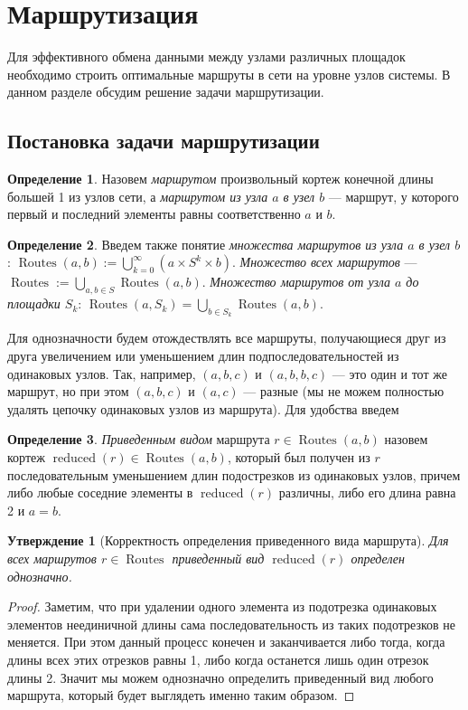\documentclass{article}
\theoremstyle{plain}
\theoremstyle{plain}
\theoremstyle{plain}
\theoremstyle{plain}
\newtheorem{claim}{Утверждение}[section]
\theoremstyle{definition}
\newtheorem{definition}{Определение}[section]
\theoremstyle{remark}
\theoremstyle{plain}
\DeclareMathOperator*{\routes}{Routes}
\DeclareMathOperator*{\reduced}{reduced}
\begin{document}
\section{Маршрутизация}
\label{RoutingSection}

Для эффективного обмена данными между узлами различных площадок необходимо строить оптимальные маршруты в сети на уровне узлов системы. В данном разделе обсудим решение задачи маршрутизации.

\subsection{Постановка задачи маршрутизации}

\begin{definition}
    Назовем \textit{маршрутом} произвольный кортеж конечной длины большей 1 из узлов сети, а \textit{маршрутом из узла $a$ в узел $b$} --- маршрут, у которого первый и последний элементы равны соответственно $a$ и $b$.
\end{definition}

\begin{definition}
    Введем также понятие \textit{множества маршрутов из узла $a$ в узел $b$}: $\routes(a, b) := \displaystyle \bigcup_{k = 0}^{\infty} ({a} \times S^k \times {b})$. \textit{Множество всех маршрутов} --- $\routes := \displaystyle \bigcup_{a, b \in S} \routes(a, b)$. \textit{Множество маршрутов от узла $a$ до площадки $S_k$}: $\routes(a, S_k) = \displaystyle \bigcup_{b \in S_k} \routes(a, b)$.
\end{definition}

Для однозначности будем отождествлять все маршруты, получающиеся друг из друга увеличением или уменьшением длин подпоследовательностей из одинаковых узлов. Так, например, $(a, b, c)$ и $(a, b, b, c)$ --- это один и тот же маршрут, но при этом $(a, b, c)$ и $(a, c)$ --- разные (мы не можем полностью удалять цепочку одинаковых узлов из маршрута). Для удобства введем

\begin{definition}
\label{RouteReducedView}
    \textit{Приведенным видом} маршрута $r \in \routes(a, b)$ назовем кортеж $\reduced(r) \in \routes(a, b)$, который был получен из $r$ последовательным уменьшением длин подострезков из одинаковых узлов, причем либо любые соседние элементы в $\reduced(r)$ различны, либо его длина равна 2 и $a = b$.
\end{definition}

\begin{claim}[Корректность определения приведенного вида маршрута]
    Для всех маршрутов $r \in \routes$ приведенный вид $\reduced(r)$ определен однозначно.
\end{claim}
\begin{proof}
    Заметим, что при удалении одного элемента из подотрезка одинаковых элементов неединичной длины сама последовательность из таких подотрезков не меняется. При этом данный процесс конечен и заканчивается либо тогда, когда длины всех этих отрезков равны 1, либо когда останется лишь один отрезок длины 2. Значит мы можем однозначно определить приведенный вид любого маршрута, который будет выглядеть именно таким образом.
\end{proof}
\end{document}
